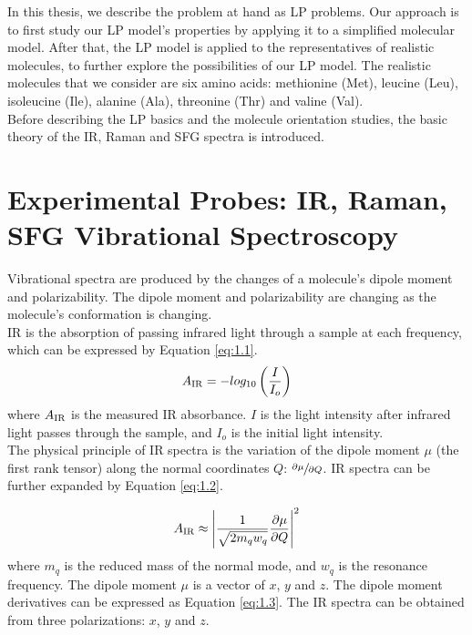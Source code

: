 In this thesis, we describe the problem at hand as LP problems. Our approach is to first study our LP model's properties by applying it to a simplified molecular model. After that, the LP model is applied to the representatives of realistic molecules, to further explore the possibilities of our LP model. The realistic molecules that we consider are six amino acids: methionine (Met), leucine (Leu), isoleucine (Ile), alanine (Ala), threonine (Thr) and valine (Val).\\

Before describing the LP basics and the molecule orientation studies, the basic theory of  the IR, Raman and SFG spectra is introduced.\\

\section{Experimental Probes: IR, Raman, SFG Vibrational Spectroscopy \cite{hore0033-rotations}}
Vibrational spectra are produced by the changes of a molecule's dipole moment and polarizability. The dipole moment and polarizability are changing as the molecule's conformation is changing. \\

IR is the absorption of passing infrared light through a sample at each frequency, which can be expressed by Equation \ref{eq:1.1}. \\

\begin{equation} \label{eq:1.1}
A_{\rm IR} = - log_{10} \left( \frac{I}{I_{o}} \right)
\end{equation}
where $A_{\rm IR}$ is the measured IR absorbance. $I$ is the light intensity after infrared light passes through the sample, and $I_{o}$ is the initial light intensity. \\

The physical principle of IR spectra is the variation of the dipole moment $\mu$ (the first rank tensor) along the normal coordinates $Q$: $\sfrac{\partial\mu}{\partial Q}$. IR spectra can be further expanded by Equation \ref{eq:1.2}.

\begin{equation} \label{eq:1.2}
A_{\rm IR} \approx \left| \frac{1}{\sqrt{2m_{q}w_{q}}} \frac{\partial\mu}{\partial Q} \right|^{2}
\end{equation}
where $m_{q}$ is the reduced mass of the normal mode, and $w_{q}$ is the resonance frequency. The dipole moment $\mu$ is a vector of $x$, $y$ and $z$. The dipole moment derivatives can be expressed as Equation \ref{eq:1.3}. The IR spectra can be obtained from three polarizations: $x$, $y$ and $z$. \\

